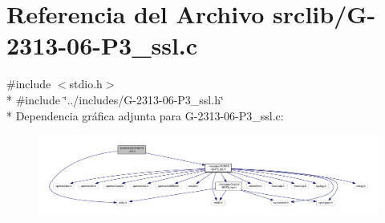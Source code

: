 \hypertarget{G-2313-06-P3__ssl_8c}{}\section{Referencia del Archivo srclib/\+G-\/2313-\/06-\/\+P3\+\_\+ssl.c}
\label{G-2313-06-P3__ssl_8c}
{\ttfamily \#include $<$stdio.\+h$>$}\\*
{\ttfamily \#include \char`\"{}../includes/\+G-\/2313-\/06-\/\+P3\+\_\+ssl.\+h\char`\"{}}\\*
Dependencia gráfica adjunta para G-\/2313-\/06-\/\+P3\+\_\+ssl.c\+:
\nopagebreak
\begin{figure}[H]
\begin{center}
\leavevmode
\includegraphics[width=350pt]{G-2313-06-P3__ssl_8c__incl}
\end{center}
\end{figure}
